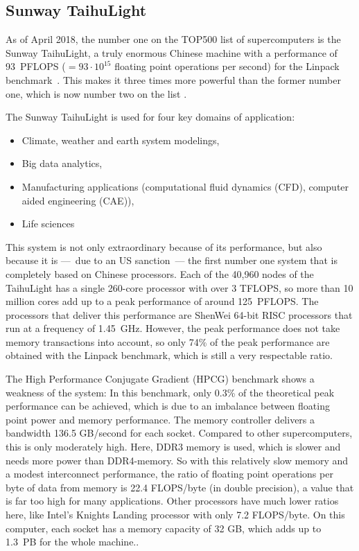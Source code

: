\subsection{Sunway TaihuLight}
As of April 2018, the number one on the TOP500 list of supercomputers is the Sunway TaihuLight, a truly enormous Chinese machine with a performance of 93~PFLOPS ($= 93\cdot 10^{15}$ floating point operations per second) for the Linpack benchmark~\cite{fu2016sunway}. This makes it three times more powerful than the former number one, which is now number two on the list  \cite{top500sunway}. 

The Sunway TaihuLight is used for four key domains of application:
\begin{itemize}
\item Climate, weather and earth system modelings,
\item Big data analytics,
\item Manufacturing applications (computational fluid dynamics (CFD), computer aided engineering (CAE)),
\item Life sciences
\end{itemize}

This system is not only extraordinary because of its performance, but also because it is ---~due to an US sanction~--- the first number one system that is completely based on Chinese processors. Each of the 40,960 nodes of the TaihuLight has a single 260-core processor with over 3 TFLOPS, so more than 10 million cores add up to a peak performance of around 125~PFLOPS. The processors that deliver this performance are ShenWei 64-bit RISC processors that run at a frequency of 1.45~GHz. However, the peak performance does not take memory transactions into account, so only 74\% of the peak performance are obtained with the Linpack benchmark, which is still a very respectable ratio. 

The High Performance Conjugate Gradient (HPCG) benchmark shows a weakness of the system: In this benchmark, only 0.3\% of the theoretical peak performance can be achieved, which is due to an imbalance between floating point power and memory performance. The memory controller delivers a bandwidth 136.5 GB/second for each socket. Compared to other supercomputers, this is only moderately high. Here, DDR3 memory is used, which is slower and needs more power than DDR4-memory. So with this relatively slow memory and a modest interconnect performance, the ratio of floating point operations per byte of data from memory is 22.4 FLOPS/byte (in double precision), a value that is far too high for many applications. Other processors have much lower ratios here, like Intel's Knights Landing processor with only 7.2 FLOPS/byte. On this computer, each socket has a memory capacity of 32 GB, which adds up to 1.3~PB for the whole machine.\cite{fu2016sunway, dongarra2016report}.


